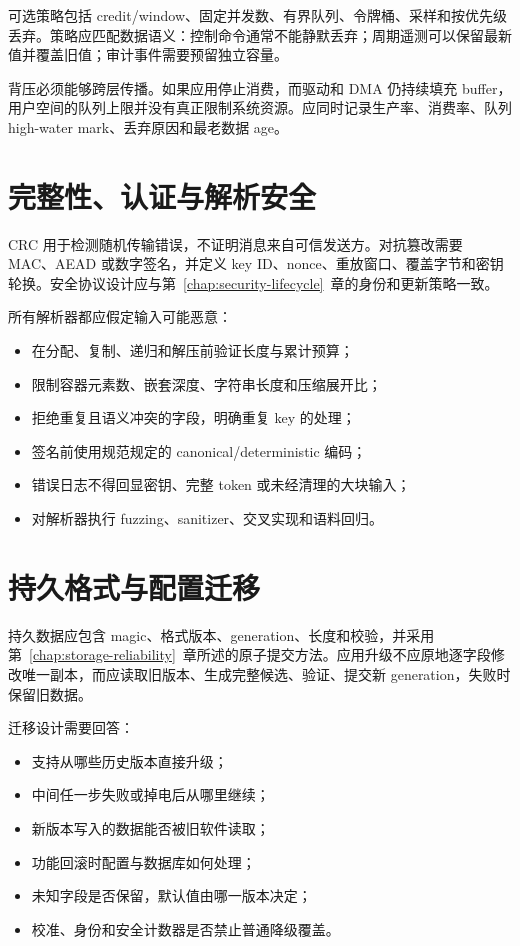 可选策略包括 credit/window、固定并发数、有界队列、令牌桶、采样和按优先级丢弃。策略应匹配数据语义：控制命令通常不能静默丢弃；周期遥测可以保留最新值并覆盖旧值；审计事件需要预留独立容量。

背压必须能够跨层传播。如果应用停止消费，而驱动和 DMA 仍持续填充 buffer，用户空间的队列上限并没有真正限制系统资源。应同时记录生产率、消费率、队列 high-water mark、丢弃原因和最老数据 age。

\section{完整性、认证与解析安全}

CRC 用于检测随机传输错误，不证明消息来自可信发送方。对抗篡改需要 MAC、AEAD 或数字签名，并定义 key ID、nonce、重放窗口、覆盖字节和密钥轮换。安全协议设计应与第~\ref{chap:security-lifecycle}~章的身份和更新策略一致。

所有解析器都应假定输入可能恶意：

\begin{itemize}
  \item 在分配、复制、递归和解压前验证长度与累计预算；
  \item 限制容器元素数、嵌套深度、字符串长度和压缩展开比；
  \item 拒绝重复且语义冲突的字段，明确重复 key 的处理；
  \item 签名前使用规范规定的 canonical/deterministic 编码；
  \item 错误日志不得回显密钥、完整 token 或未经清理的大块输入；
  \item 对解析器执行 fuzzing、sanitizer、交叉实现和语料回归。
\end{itemize}

\section{持久格式与配置迁移}

持久数据应包含 magic、格式版本、generation、长度和校验，并采用第~\ref{chap:storage-reliability}~章所述的原子提交方法。应用升级不应原地逐字段修改唯一副本，而应读取旧版本、生成完整候选、验证、提交新 generation，失败时保留旧数据。

迁移设计需要回答：

\begin{itemize}
  \item 支持从哪些历史版本直接升级；
  \item 中间任一步失败或掉电后从哪里继续；
  \item 新版本写入的数据能否被旧软件读取；
  \item 功能回滚时配置与数据库如何处理；
  \item 未知字段是否保留，默认值由哪一版本决定；
  \item 校准、身份和安全计数器是否禁止普通降级覆盖。
\end{itemize}


